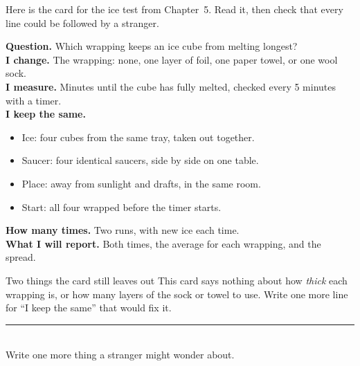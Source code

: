 Here is the card for the ice test from Chapter~5. Read it, then check that every line could be followed by a stranger.

\begin{tcolorbox}[enhanced,colback=white,colframe=sky,boxrule=1.3pt,arc=2mm,left=8pt,right=8pt,top=5pt,bottom=5pt,before skip=7pt,after skip=7pt]
\sffamily\small
\textbf{Question.} Which wrapping keeps an ice cube from melting longest?\\[3pt]
\textbf{I change.} The wrapping: none, one layer of foil, one paper towel, or one wool sock.\\[3pt]
\textbf{I measure.} Minutes until the cube has fully melted, checked every 5 minutes with a timer.\\[3pt]
\textbf{I keep the same.}
\begin{itemize}[leftmargin=1.4em,itemsep=0pt,topsep=1pt]
\item Ice: four cubes from the same tray, taken out together.
\item Saucer: four identical saucers, side by side on one table.
\item Place: away from sunlight and drafts, in the same room.
\item Start: all four wrapped before the timer starts.
\end{itemize}
\textbf{How many times.} Two runs, with new ice each time.\\[3pt]
\textbf{What I will report.} Both times, the average for each wrapping, and the spread.
\end{tcolorbox}

\begin{puzzle}{Two things the card still leaves out}
This card says nothing about how \emph{thick} each wrapping is, or how many layers of the sock or towel to use. Write one more line for ``I keep the same'' that would fix it.\\
\rule{\linewidth}{0.5pt}\\[4pt]
Write one more thing a stranger might wonder about. \wline[5cm]
\end{puzzle}
\clearpage
